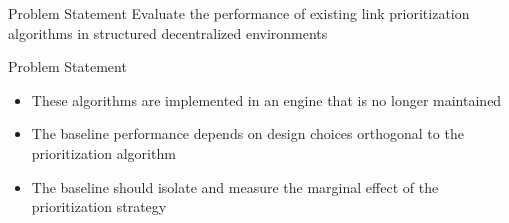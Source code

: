 
\begin{frame}{Problem Statement}
    \centering
    Evaluate the performance of existing link prioritization algorithms in structured decentralized environments
\end{frame}

\begin{frame}{Problem Statement}
    \begin{itemize}
        \item These algorithms are implemented in an engine that is no longer maintained
        \item The baseline performance depends on design choices orthogonal to the prioritization algorithm
        \item The baseline should isolate and measure the marginal effect of the prioritization strategy
    \end{itemize}
\end{frame}
